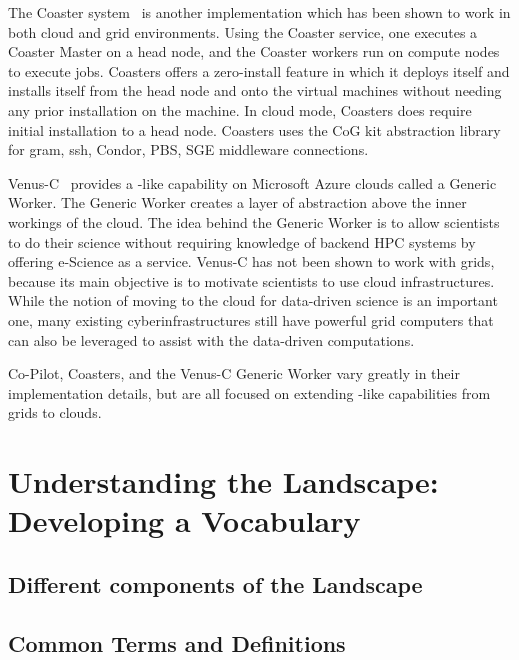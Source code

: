 \documentclass{sig-alternate}
\begin{document}
The Coaster system~\cite{coasters} is another \pilotjob implementation
which has been shown to work in both cloud and grid
environments. Using the Coaster service, one executes a Coaster Master
on a head node, and the Coaster workers run on compute nodes to
execute jobs. Coasters offers a zero-install feature in which it
deploys itself and installs itself from the head node and onto the
virtual machines without needing any prior installation on the
machine. In cloud mode, Coasters does require initial installation to
a head node. Coasters uses the CoG kit abstraction library for gram,
ssh, Condor, PBS, SGE middleware connections.
 
Venus-C~\cite{venusc-generic-worker} provides a \pilotjob-like
capability on Microsoft Azure clouds called a Generic Worker. The
Generic Worker creates a layer of abstraction above the inner workings
of the cloud.  The idea behind the Generic Worker is to allow
scientists to do their science without requiring knowledge of backend
HPC systems by offering e-Science as a service. Venus-C has not been
shown to work with grids, because its main objective is to motivate
scientists to use cloud infrastructures.  While the notion of moving
to the cloud for data-driven science is an important one, many
existing cyberinfrastructures still have powerful grid computers that
can also be leveraged to assist with the data-driven computations.

Co-Pilot, Coasters, and the Venus-C Generic Worker vary greatly in
their implementation details, but are all focused on extending
\pilotjob-like capabilities from grids to clouds.

\section{Understanding the Landscape: Developing a Vocabulary}



\subsection{Different components of the Landscape}



\subsection{Common Terms and Definitions}
\end{document}
